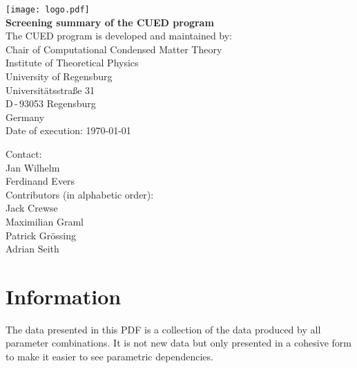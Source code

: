 \documentclass[11pt, a4paper]{scrartcl}
\begin{document}

\begin{titlepage}
  \sffamily
  \begin{center}
{
\texttt{[image: logo.pdf]}
\\[5em]
\Huge \bfseries Screening summary of the CUED program}
\\[3em]\large
The CUED program is developed and maintained by:
\\[3em]
Chair of Computational Condensed Matter Theory
  \\[0.5em]
Institute of Theoretical Physics
  \\[0.5em]
University of Regensburg
  \\[0.5em]
Universitätsstraße 31
  \\[0.5em]
D\,-\,93053 Regensburg
  \\[0.5em]
Germany
\\[3em]
Date of execution: \today
  \\[0.5em]
  \end{center}{\large
  Contact:
  \\[1em]
    Jan Wilhelm
      \\[0.5em]
    Ferdinand Evers
  \\[3em]
  Contributors (in alphabetic order): 
  \\[1em]
  Jack Crewse
  \\[0.5em]
  Maximilian Graml
  \\[0.5em]
  Patrick Grössing
  \\[0.5em]
  Adrian Seith
  }
\end{titlepage}

\pagestyle{plain}

\tableofcontents

\pagestyle{fancy}
\section{Information}
The data presented in this PDF is a collection of the data produced by all parameter combinations.
It is not new data but only presented in a cohesive form to make it easier to see parametric dependencies.
\end{document}
